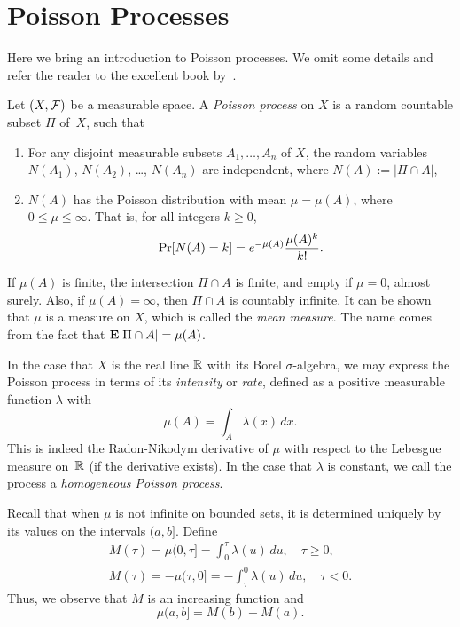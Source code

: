 \section{Poisson Processes}
Here we bring an introduction to Poisson processes. We omit some details and refer the reader to the excellent book by~\citet{kingman1992poisson}. 

Let $(X, \mathcal{F})$ be a measurable space. A \emph{Poisson process} on $X$ is a random countable subset $\Pi$ of~$X$, such that
\begin{enumerate}
    \item For any disjoint measurable subsets $A_1,\ldots, A_n$ of $X$, the random variables $N(A_1)$, $N(A_2)$, \dots, $N(A_n)$ are independent, where $N(A) := |\Pi \cap A|$,
    \item $N(A)$ has the Poisson distribution with mean $\mu = \mu(A)$, where $0\leq \mu \leq \infty$. That is, for all integers $k \geq 0$,
        \[
            \mathop{\mathrm{Pr}}[N(A) = k] = e^{-\mu(A)} \frac{\mu(A)^k}{k!}.
        \]
\end{enumerate}
If $\mu(A)$ is finite, the intersection $\Pi \cap A$ is finite, and empty if $\mu = 0$, almost surely. Also, if $\mu(A) = \infty$, then $\Pi\cap A$ is countably infinite. It can be shown that $\mu$ is a measure on $X$, which is called the \emph{mean measure}. The name comes from the fact that $\mathbf{E}{|\Pi \cap A|} = \mu(A)$.

In the case that $X$ is the real line $\mathbb{R}$ with its Borel $\sigma$-algebra, we may express the Poisson process in terms of its \emph{intensity} or \emph{rate}, defined as a positive measurable function $\lambda$ with
\[
    \mu(A) = \int_A \lambda(x)\,dx.
\]
This is indeed the Radon-Nikodym derivative of $\mu$ with respect to the Lebesgue measure on~$\mathbb{R}$ (if the derivative exists). In the case that $\lambda$ is constant, we call the process a \emph{homogeneous Poisson process}.

Recall that when $\mu$ is not infinite on bounded sets, it is determined uniquely by its values on the intervals $(a, b]$. Define
\begin{align*}
    M(\tau) = \mu(0, \tau] = \int_0^\tau \lambda(u)\, du,\quad \tau \geq 0,\\
    M(\tau) = -\mu(\tau, 0] = -\int_\tau^0 \lambda(u)\, du,\quad \tau < 0.
\end{align*}
Thus, we observe that $M$ is an increasing function and 
\[
    \mu(a, b] = M(b) - M(a).
\] 

